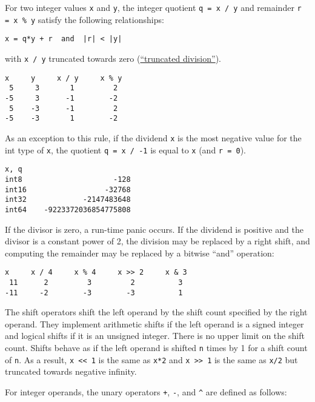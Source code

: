 {For two integer values \texttt{x} and \texttt{y}, the integer quotient
\texttt{q = x / y} and remainder \texttt{r = x \% y} satisfy the
following relationships:

\begin{Verbatim}[frame=single]
x = q*y + r  and  |r| < |y|
\end{Verbatim}

with \texttt{x / y} truncated towards zero
(\href{http://en.wikipedia.org/wiki/Modulo\_operation}{``truncated
division''}).

\begin{Verbatim}[frame=single]
 x     y     x / y     x % y
 5     3       1         2
-5     3      -1        -2
 5    -3      -1         2
-5    -3       1        -2
\end{Verbatim}

As an exception to this rule, if the dividend \texttt{x} is the most
negative value for the int type of \texttt{x}, the quotient
\texttt{q = x / -1} is equal to \texttt{x} (and \texttt{r = 0}).

\begin{Verbatim}[frame=single]
             x, q
int8                     -128
int16                  -32768
int32             -2147483648
int64    -9223372036854775808
\end{Verbatim}

If the divisor is zero, a run-time panic
occurs. If the dividend is positive and the divisor is a constant power
of 2, the division may be replaced by a right shift, and computing the
remainder may be replaced by a bitwise ``and'' operation:

\begin{Verbatim}[frame=single]
 x     x / 4     x % 4     x >> 2     x & 3
 11      2         3         2          3
-11     -2        -3        -3          1
\end{Verbatim}

The shift operators shift the left operand by the shift count specified
by the right operand. They implement arithmetic shifts if the left
operand is a signed integer and logical shifts if it is an unsigned
integer. There is no upper limit on the shift count. Shifts behave as if
the left operand is shifted \texttt{n} times by 1 for a shift count of
\texttt{n}. As a result, \texttt{x \textless{}\textless{} 1} is the same
as \texttt{x*2} and \texttt{x \textgreater{}\textgreater{} 1} is the
same as \texttt{x/2} but truncated towards negative infinity.

For integer operands, the unary operators \texttt{+}, \texttt{-}, and
\texttt{\^{}} are defined as follows:

}
